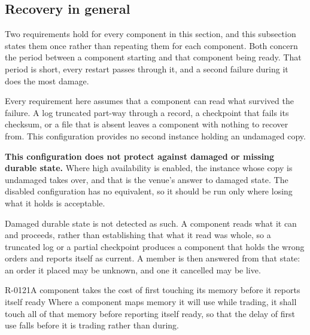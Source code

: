 \subsection{Recovery in general}
\label{sec:ha:disabled:recovery}

Two requirements hold for every component in this section, and this subsection
states them once rather than repeating them for each component. Both concern the
period between a component starting and that component being ready. That period
is short, every restart passes through it, and a second failure during it does
the most damage.

Every requirement here assumes that a component can read what survived the
failure. A log truncated part-way through a record, a checkpoint that fails its
checksum, or a file that is absent leaves a component with nothing to recover
from. This configuration provides no second instance holding an undamaged copy.

\textbf{This configuration does not protect against damaged or missing durable
state.} Where high availability is enabled, the instance whose copy is
undamaged takes over, and that is the venue's answer to damaged state. The
disabled configuration has no equivalent, so it should be run only where losing
what it holds is acceptable.

\begin{gap}{}
  Damaged durable state is not detected as such. A component reads what it can
  and proceeds, rather than establishing that what it read was whole, so a
  truncated log or a partial checkpoint produces a component that holds the wrong
  orders and reports itself as current. A member is then answered from that
  state: an order it placed may be unknown, and one it cancelled may be live.
\end{gap}

\begin{requirement}{R-0121}{A component takes the cost of first touching its memory before it reports itself ready}
  Where a component maps memory it will use while trading, it shall touch all of
  that memory before reporting itself ready, so that the delay of first use falls
  before it is trading rather than during.
\end{requirement}

